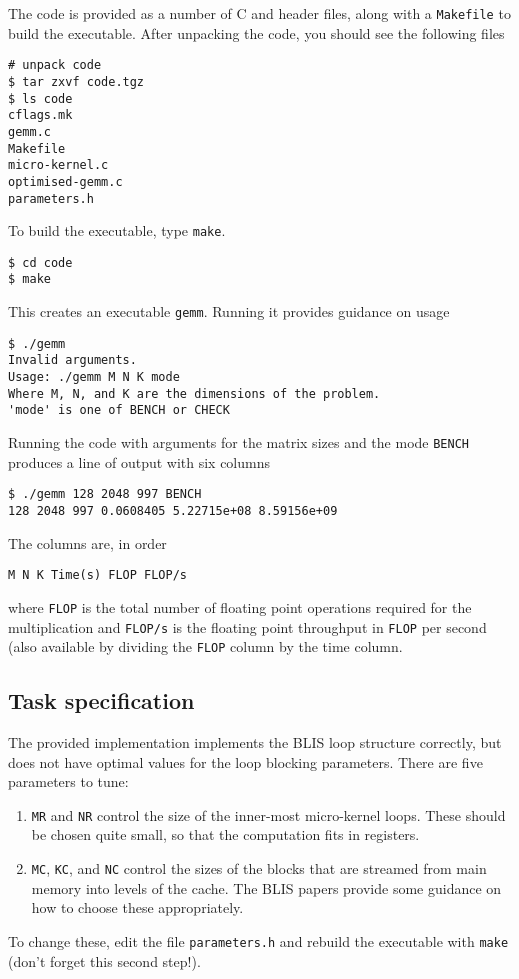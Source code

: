 \documentclass[a4paper]{article}
\begin{document}
The code is provided as a number of C and header files, along with a
\texttt{Makefile} to build the executable. After unpacking the code,
you should see the following files
\begin{verbatim}
# unpack code
$ tar zxvf code.tgz
$ ls code
cflags.mk
gemm.c
Makefile
micro-kernel.c
optimised-gemm.c
parameters.h
\end{verbatim}

To build the executable, type \texttt{make}.
\begin{verbatim}
$ cd code
$ make
\end{verbatim}
This creates an executable \texttt{gemm}. Running it provides guidance
on usage
\begin{verbatim}
$ ./gemm
Invalid arguments.
Usage: ./gemm M N K mode
Where M, N, and K are the dimensions of the problem.
'mode' is one of BENCH or CHECK
\end{verbatim}
Running the code with arguments for the matrix sizes and the mode
\texttt{BENCH} produces a line of output with six columns
\begin{verbatim}
$ ./gemm 128 2048 997 BENCH
128 2048 997 0.0608405 5.22715e+08 8.59156e+09
\end{verbatim}
The columns are, in order
\begin{verbatim}
M N K Time(s) FLOP FLOP/s
\end{verbatim}
where \texttt{FLOP} is the total number of floating point operations
required for the multiplication and \texttt{FLOP/s} is the floating
point throughput in \texttt{FLOP} per second (also available by
dividing the \texttt{FLOP} column by the time column.

\subsection{Task specification}
\label{sec:task}
The provided implementation implements the BLIS loop structure
correctly, but does not have optimal values for the loop blocking
parameters. There are five parameters to tune:
\begin{enumerate}
\item \texttt{MR} and \texttt{NR} control the size of the inner-most
  micro-kernel loops. These should be chosen quite small, so that the
  computation fits in registers.
\item \texttt{MC}, \texttt{KC}, and \texttt{NC} control the sizes of
  the blocks that are streamed from main memory into levels of the
  cache. The BLIS papers provide some guidance on how to choose these
  appropriately.
\end{enumerate}
To change these, edit the file \texttt{parameters.h} and rebuild the
executable with \texttt{make} (don't forget this second step!).
\end{document}
